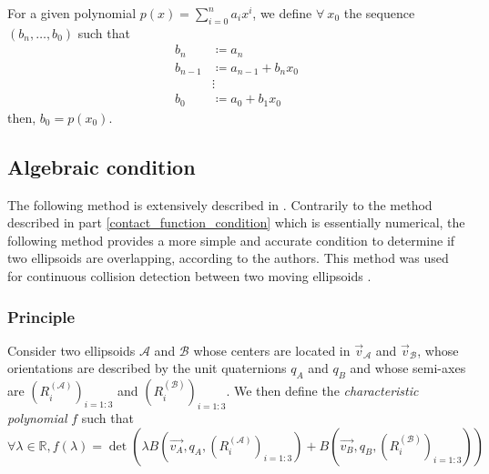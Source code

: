 \documentclass[class=report, float=false, crop=false]{standalone}
\begin{document}
For a given polynomial $p(x) = \sum_{i = 0}^n a_ix^i$, we define $\forall~x_0$ the sequence $(b_n,\ldots,b_0)$ such that
\begin{equation}
\begin{aligned}
b_n &\coloneqq a_n\\
b_{n-1} &\coloneqq a_{n-1} + b_n x_0\\
&\vdots\\
b_0 &\coloneqq a_0 + b_1x_0
\end{aligned}
\end{equation}
then, $\boxed{b_0 = p(x_0)}$.

\subsection{Algebraic condition}
\label{wang}

The following method is extensively described in \cite{wang2001algebraic}. Contrarily to the method described in part \ref{contact_function_condition} which is essentially numerical, the following method provides a more simple and accurate condition to determine if two ellipsoids are overlapping, according to the authors. This method was used for continuous collision detection between two moving ellipsoids \cite{choi2009continuous}.

\subsubsection{Principle}

Consider two ellipsoids $\mathcal{A}$ and $\mathcal{B}$ whose centers are located in $\vec{v}_{\mathcal{A}}$ and $\vec{v}_{\mathcal{B}}$, whose orientations are described by the unit quaternions $q_A$ and $q_B$ and whose semi-axes are $(R_i^{(\mathcal{A})})_{i=1:3}$ and $(R_i^{(\mathcal{B})})_{i=1:3}$. We then define the \textit{characteristic polynomial} $f$ such that
\begin{equation}
\forall \lambda \in \mathbb{R}, f(\lambda) = \det\left(\lambda B(\vec{v_A},q_A,(R_i^{(\mathcal{A})})_{i=1:3}) + B(\vec{v_B},q_B,(R_i^{(\mathcal{B})})_{i=1:3})\right)
\label{characteristic_polynomial}
\end{equation}
\end{document}
